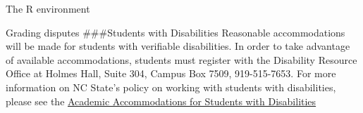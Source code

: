 \documentclass[
  ignorenonframetext,
]{beamer}
\begin{document}
\begin{frame}[fragile]{The R environment}
\begin{block}
\begin{block}{Grading disputes}
\#\#\#Students with Disabilities Reasonable accommodations will be made
for students with verifiable disabilities. In order to take advantage of
available accommodations, students must register with the Disability
Resource Office at Holmes Hall, Suite 304, Campus Box 7509,
919-515-7653. For more information on NC State's policy on working with
students with disabilities, please see the
\href{https://policies.ncsu.edu/regulation/reg-02-20-01/}{Academic
Accommodations for Students with Disabilities}
\end{block}
\end{block}
\end{frame}
\end{document}
